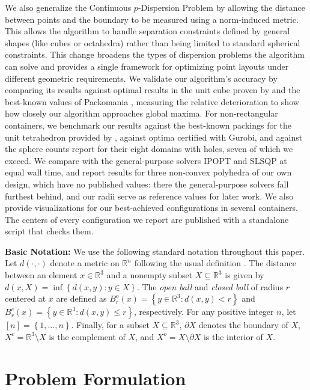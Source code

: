 \documentclass[preprint,12pt]{elsarticle}
\theoremstyle{remark}
\def \R {\mathbb{R}}
\newcommand{\set}[1]{\left\{ #1 \right\}}
\begin{document}
We also generalize the Continuous $p$-Dispersion Problem by allowing the
distance between points and the boundary to be measured using a norm-induced
metric. This allows the algorithm to handle separation constraints defined by
general shapes (like cubes or octahedra) rather than being limited to standard
spherical constraints. This change broadens the types of dispersion problems the
algorithm can solve and provides a single framework for optimizing point layouts
under different geometric requirements. We validate our algorithm's accuracy by
comparing its results against optimal results in the unit cube proven by
\citet{schaer1966, schaer1994} and the best-known values of Packomania
\citep{packomania}, measuring the relative deterioration to show how closely our
algorithm approaches global maxima. For non-rectangular containers, we benchmark
our results against the best-known packings for the unit tetrahedron provided by
\citet{kazakov2018}, against optima certified with Gurobi, and against the
sphere counts \citet{stoyan2013} report for their eight domains with holes,
seven of which we exceed. We compare with the general-purpose solvers IPOPT and
SLSQP at equal wall time, and report results for three non-convex polyhedra of
our own design, which have no published values: there the general-purpose
solvers fall furthest behind, and our radii serve as reference values for later
work. We also provide visualizations for our best-achieved configurations in
several containers. The centers of every configuration we report are published
with a standalone script that checks them.

\textbf{Basic Notation:} We use the following standard notation throughout this
paper. Let $d(\cdot, \cdot)$ denote a metric on $\R^n$ following the usual
definition \citep{rosen2012}. The distance between an element $x \in \R^3$ and a
nonempty subset $X \subseteq \R^3$ is given by $d(x, X) = \inf \set{d(x, y) : y
\in X}$. The \textit{open ball} and \textit{closed ball} of radius $r$ centered
at $x$ are defined as $B_r^o(x) = \set{y \in \R^3 : d(x, y) < r}$ and $B_r^c(x)
= \set{y \in \R^3 : d(x, y) \le r}$, respectively. For any positive integer $n$,
let $[n] = \set{1, \dots, n}$. Finally, for a subset $X \subseteq \R^3$,
$\partial X$ denotes the boundary of $X$, $X^c = \R^3 \setminus X$ is the
complement of $X$, and $X^o = X \setminus \partial X$ is the interior of $X$.

\section{Problem Formulation}
\end{document}
